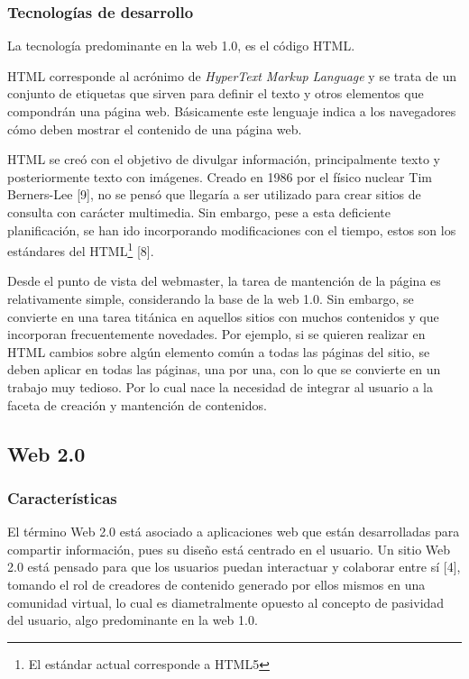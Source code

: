 \subsubsection{Tecnologías de desarrollo}
La tecnología predominante en la web 1.0, es el código HTML.

HTML corresponde al acrónimo de \textit{HyperText Markup Language} y se trata de un conjunto de etiquetas que sirven para 
definir el texto y otros elementos que compondrán una página web. Básicamente este lenguaje indica a los navegadores cómo 
deben mostrar el contenido de una página web.

HTML se creó con el objetivo de divulgar información, principalmente texto y posteriormente texto con imágenes. 
Creado en 1986 por el físico nuclear Tim Berners-Lee [9], no se pensó que llegaría  a ser utilizado para crear sitios de 
consulta con carácter multimedia. Sin embargo, pese a esta deficiente planificación, se han ido incorporando modificaciones 
con el tiempo, estos son los estándares del HTML\footnote{El estándar actual corresponde a HTML5} [8].

Desde el punto de vista del webmaster, la tarea de mantención de la página es relativamente simple, considerando la base de 
la web 1.0. Sin embargo, se convierte en una tarea titánica en aquellos sitios con muchos contenidos y que incorporan 
frecuentemente novedades. Por ejemplo, si se quieren realizar en HTML cambios sobre algún elemento común a todas las páginas 
del sitio, se deben aplicar en todas las páginas, una por una, con lo que se  convierte en un trabajo muy tedioso. Por lo cual
nace la necesidad de integrar al usuario a la faceta de creación y mantención de contenidos.

\subsection{Web 2.0}
\subsubsection{Características}

El término Web 2.0 está asociado a aplicaciones web que están desarrolladas para compartir información, 
pues su diseño está centrado en el usuario. Un sitio Web 2.0 está pensado para que los usuarios puedan interactuar 
y colaborar entre sí [4], tomando el rol de creadores de contenido generado por ellos mismos en una comunidad virtual,
lo cual es diametralmente opuesto al concepto de pasividad del usuario, algo predominante en la web 1.0.


